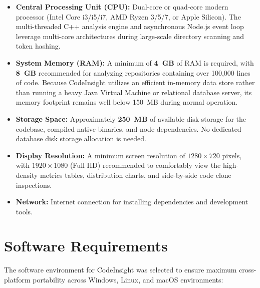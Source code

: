 \begin{itemize}
    \item \textbf{Central Processing Unit (CPU):} Dual-core or quad-core modern processor (Intel Core i3/i5/i7, AMD Ryzen 3/5/7, or Apple Silicon). The multi-threaded C++ analysis engine and asynchronous Node.js event loop leverage multi-core architectures during large-scale directory scanning and token hashing.
    \item \textbf{System Memory (RAM):} A minimum of \textbf{4~GB} of RAM is required, with \textbf{8~GB} recommended for analyzing repositories containing over 100,000 lines of code. Because CodeInsight utilizes an efficient in-memory data store rather than running a heavy Java Virtual Machine or relational database server, its memory footprint remains well below 150~MB during normal operation.
    \item \textbf{Storage Space:} Approximately \textbf{250~MB} of available disk storage for the codebase, compiled native binaries, and node dependencies. No dedicated database disk storage allocation is needed.
    \item \textbf{Display Resolution:} A minimum screen resolution of $1280 \times 720$ pixels, with $1920 \times 1080$ (Full HD) recommended to comfortably view the high-density metrics tables, distribution charts, and side-by-side code clone inspections.
    \item \textbf{Network:} Internet connection for installing dependencies and development tools.
\end{itemize}

\section{Software Requirements}
The software environment for CodeInsight was selected to ensure maximum cross-platform portability across Windows, Linux, and macOS environments:

